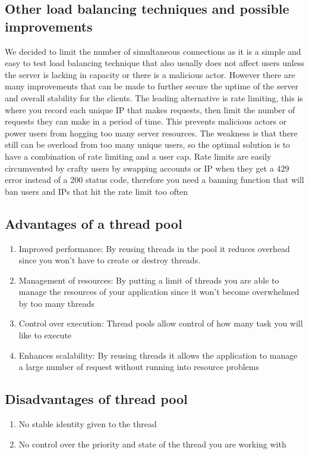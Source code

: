 \documentclass[conference]{IEEEtran}
\begin{document}
\subsection*{Other load balancing techniques and possible improvements}
We decided to limit the number of simultaneous connections as it is a simple and easy to test load balancing technique that also usually does not affect users unless the server is lacking in capacity or there is a malicious actor. However there are many improvements that can be made to further secure the uptime of the server and overall stability for the clients.
\linebreak
The leading alternative is rate limiting, this is where you record each unique IP that makes requests, then limit the number of requests they can make in a period of time. This prevents malicious actors or power users from hogging too many server resources. The weakness is that there still can be overload from too many unique users, so the optimal solution is to have a combination of rate limiting and a user cap. Rate limits are easily circumvented by crafty users by swapping accounts or IP when they get a 429 error instead of a 200 status code, therefore you need a banning function that will ban users and IPs that hit the rate limit too often
\subsection*{Advantages of a thread pool}
\begin{enumerate}
	\item Improved performance: By reusing threads in the pool it reduces overhead since you won’t have to create or destroy threads.
	\item Management of resources: By putting a limit of threads you are able to  manage the resources of your application since it won’t become overwhelmed by too many  threads
	\item Control over execution: Thread pools allow control of how many task you will like to execute
	\item Enhances scalability: By reusing threads it allows the application to manage a large number of request without running into resource problems
\end{enumerate}
\subsection*{Disadvantages of thread pool}
\begin{enumerate}
	\item No stable identity given to the thread
	\item No control over the priority and state of the thread you are working with
\end{enumerate}
\end{document}
